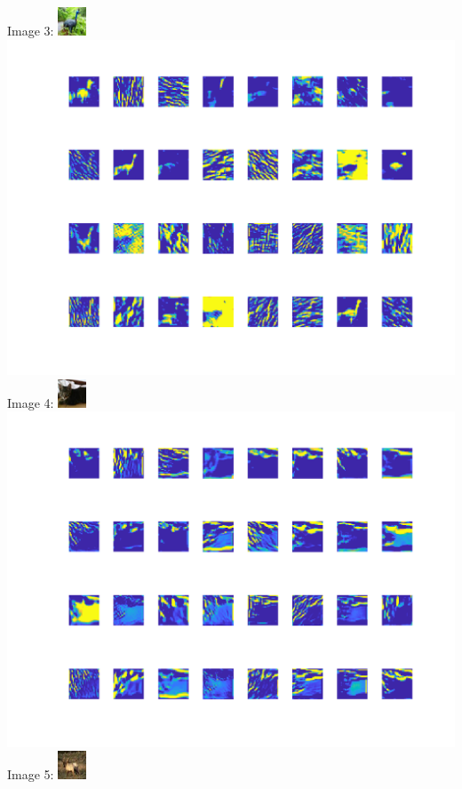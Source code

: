 \documentclass[10pt]{article}
\begin{document}
Image 3:
\includegraphics{3}\\
\includegraphics[scale=0.65]{3_filter_res}\\
\newpage
Image 4:
\includegraphics{4}\\
\includegraphics[scale=0.65]{4_filter_res}\\
Image 5:
\includegraphics{5}\\
\end{document}
